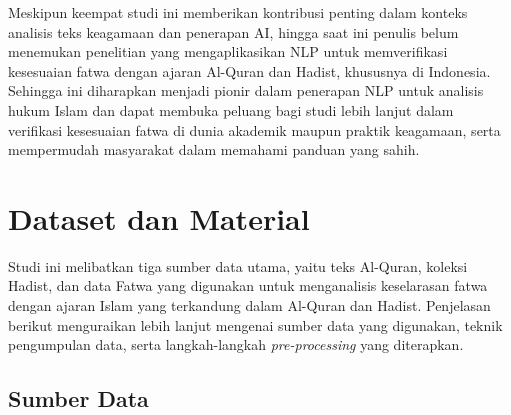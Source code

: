 \documentclass[12pt,a4paper]{article}
\begin{document}
Meskipun keempat studi ini memberikan kontribusi penting dalam konteks analisis teks keagamaan dan penerapan AI, hingga saat ini penulis belum menemukan penelitian yang mengaplikasikan NLP untuk memverifikasi kesesuaian fatwa dengan ajaran Al-Quran dan Hadist, khususnya di Indonesia.  Sehingga ini diharapkan menjadi pionir dalam penerapan NLP untuk analisis hukum Islam dan dapat membuka peluang bagi studi lebih lanjut dalam verifikasi kesesuaian fatwa di dunia akademik maupun praktik keagamaan, serta mempermudah masyarakat dalam memahami panduan yang sahih.



\section{Dataset dan Material}

Studi ini melibatkan tiga sumber data utama, yaitu teks Al-Quran, koleksi Hadist, dan data Fatwa yang digunakan untuk menganalisis keselarasan fatwa dengan ajaran Islam yang terkandung dalam Al-Quran dan Hadist. Penjelasan berikut menguraikan lebih lanjut mengenai sumber data yang digunakan, teknik pengumpulan data, serta langkah-langkah \textit{pre-processing} yang diterapkan.

\subsection{Sumber Data}
\end{document}
